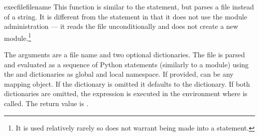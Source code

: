 \begin{funcdesc}{execfile}{filename}
  This function is similar to the
   statement, but parses a file instead of a string.  It
  is different from the  statement in that it does not
  use the module administration --- it reads the file unconditionally
  and does not create a new module.\footnote{It is used relatively
  rarely so does not warrant being made into a statement.}

  The arguments are a file name and two optional dictionaries.  The file is
  parsed and evaluated as a sequence of Python statements (similarly to a
  module) using the  and  dictionaries as global and
  local namespace. If provided,  can be any mapping object.
  If the  dictionary is omitted it defaults to the 
  dictionary. If both dictionaries are omitted, the expression is executed in
  the environment where  is called.  The return value is
  .

\end{funcdesc}

